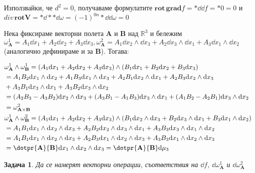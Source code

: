 \documentclass[12pt]{article}
\newtheorem{problem}{Задача}
\begin{document}
\begin{large}
Използвайки, че $d^2=0$, получаваме формулатите $\mathbf{rot} \, \mathbf{grad}f=\ast \dd \dd f = \ast 0 = 0$ и $div \, \mathbf{rot} \mathbf{V}=\ast \dd \ast \ast \dd \omega = (-1)^{0n}\ast \dd \dd \omega = 0$

Нека фиксираме векторни полета $\mathbf{A}$ и $\mathbf{B}$ над $\mathbb{R}^3$ и бележим $\omega_{\mathbf{A}}^1=A_1 \dd x_1 + A_2 \dd x_2 + A_3 \dd x_3, \omega_{\mathbf{A}}^2=A_1 \dd x_2 \wedge \dd x_3 + A_2 \dd x_3 \wedge \dd x_1 + A_3 \dd x_1 \wedge \dd x_2$(аналогично дефинираме и за $\mathbf{B}$). Тогава:

\begin{align*}
&\omega_{\mathbf{A}}^1 \wedge \omega_{\mathbf{B}}^1 = (A_1 \dd x_1 + A_2 \dd x_2 + A_3 \dd x_3) \wedge (B_1 \dd x_1 + B_2 \dd x_2 + B_3 \dd x_3) \\
&= A_1 B_2 \dd x_1 \wedge \dd x_2 + A_1 B_3 \dd x_1 \wedge \dd x_3 + A_2 B_1 \dd x_2 \wedge \dd x_1 + A_2 B_3 \dd x_2 \wedge \dd x_3 \\
&+ A_3 B_1 \dd x_3 \wedge \dd x_1 + A_3 B_2 \dd x_3 \wedge \dd x_2 \\
&=(A_2 B_3 - A_3 B_2)\dd x_2 \wedge \dd x_3 + (A_3 B_1 - A_1 B_3)\dd x_3 \wedge \dd x_1 + (A_1 B_2 - A_2 B_1)\dd x_3 \wedge \dd x_2 \\
&= \omega_{\mathbf{A} \times \mathbf{B}}^2 \\
&\omega_{\mathbf{A}}^1 \wedge \omega_{\mathbf{B}}^2 = (A_1 \dd x_1 + A_2 \dd x_2 + A_3 \dd x_3) \wedge (B_1 \dd x_2 \wedge \dd x_3 + B_2 \dd x_3 \wedge \dd x_1 + B_3 \dd x_1 \wedge \dd x_2) \\
&= A_1 B_1 \dd x_1 \wedge \dd x_2 \wedge \dd x_3  +  A_2 B_2 \dd x_2 \wedge \dd x_3 \wedge \dd x_1  + A_3 B_3 \dd x_3 \wedge \dd x_1 \wedge \dd x_2 \\
&=A_1 B_1 \dd x_1 \wedge \dd x_2 \wedge \dd x_3 + A_2 B_3 \dd x_1 \wedge \dd x_2 \wedge \dd x_3 + A_3 B_3 \dd x_1 \wedge \dd x_2 \wedge \dd x_3 \\
&=\dotpr{\mathbf{A}}{\mathbf{B}} \dd x_1 \wedge \dd x_2 \wedge \dd x_3 = \dotpr{\mathbf{A}}{\mathbf{B}} \dd \mu_3
\end{align*}

\begin{problem}
Да се намерят векторни операции, съответствия на $\dd f$, $\dd \omega_{\mathbf{A}}^1$ и $\dd \omega_{\mathbf{A}}^2$
\end{problem}


\end{large}
\end{document}
